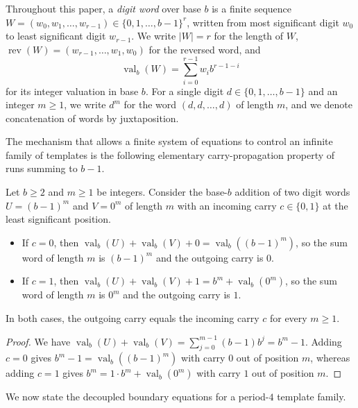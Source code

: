 \documentclass[12pt,reqno]{article}
\DeclareMathOperator{\Rev}{rev}
\DeclareMathOperator{\val}{val}
\begin{document}
Throughout this paper, a \emph{digit word} over base $b$ is a finite sequence $W = (w_0, w_1, \ldots, w_{r-1}) \in \{0, 1, \ldots, b-1\}^r$, written from most significant digit $w_0$ to least significant digit $w_{r-1}$. We write $|W| = r$ for the length of $W$, $\Rev(W) = (w_{r-1}, \ldots, w_1, w_0)$ for the reversed word, and
\begin{displaymath}
\val_b(W) = \sum_{i=0}^{r-1} w_i b^{r-1-i}
\end{displaymath}
for its integer valuation in base $b$. For a single digit $d \in \{0, 1, \ldots, b-1\}$ and an integer $m \geq 1$, we write $d^m$ for the word $(d, d, \ldots, d)$ of length $m$, and we denote concatenation of words by juxtaposition.

The mechanism that allows a finite system of equations to control an infinite family of templates is the following elementary carry-propagation property of runs summing to $b-1$.

\begin{lemma}\label{lem:wire}
Let $b \geq 2$ and $m \geq 1$ be integers. Consider the base-$b$ addition of two digit words $U = (b-1)^m$ and $V = 0^m$ of length $m$ with an incoming carry $c \in \{0, 1\}$ at the least significant position.
\begin{itemize}
\item[\rm (a)] If $c = 0$, then $\val_b(U) + \val_b(V) + 0 = \val_b((b-1)^m)$, so the sum word of length $m$ is $(b-1)^m$ and the outgoing carry is $0$.
\item[\rm (b)] If $c = 1$, then $\val_b(U) + \val_b(V) + 1 = b^m + \val_b(0^m)$, so the sum word of length $m$ is $0^m$ and the outgoing carry is $1$.
\end{itemize}
In both cases, the outgoing carry equals the incoming carry $c$ for every $m \geq 1$.
\end{lemma}

\begin{proof}
We have $\val_b(U) + \val_b(V) = \sum_{j=0}^{m-1} (b-1)b^j = b^m - 1$. Adding $c = 0$ gives $b^m - 1 = \val_b((b-1)^m)$ with carry $0$ out of position $m$, whereas adding $c = 1$ gives $b^m = 1 \cdot b^m + \val_b(0^m)$ with carry $1$ out of position $m$.
\end{proof}

We now state the decoupled boundary equations for a period-$4$ template family.
\end{document}
